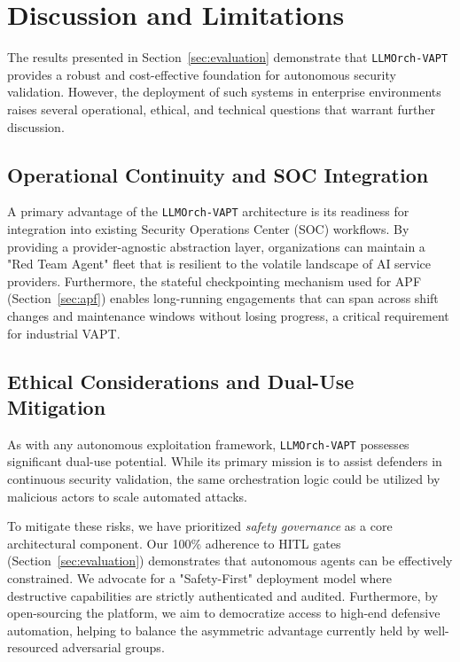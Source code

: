 \section{Discussion and Limitations}
\label{sec:discussion}

The results presented in Section~\ref{sec:evaluation} demonstrate that \texttt{LLMOrch-VAPT} provides a robust and cost-effective foundation for autonomous security validation. However, the deployment of such systems in enterprise environments raises several operational, ethical, and technical questions that warrant further discussion.

\subsection{Operational Continuity and SOC Integration}
A primary advantage of the \texttt{LLMOrch-VAPT} architecture is its readiness for integration into existing Security Operations Center (SOC) workflows. By providing a provider-agnostic abstraction layer, organizations can maintain a "Red Team Agent" fleet that is resilient to the volatile landscape of AI service providers. Furthermore, the stateful checkpointing mechanism used for APF (Section~\ref{sec:apf}) enables long-running engagements that can span across shift changes and maintenance windows without losing progress, a critical requirement for industrial VAPT.

\subsection{Ethical Considerations and Dual-Use Mitigation}
As with any autonomous exploitation framework, \texttt{LLMOrch-VAPT} possesses significant dual-use potential. While its primary mission is to assist defenders in continuous security validation, the same orchestration logic could be utilized by malicious actors to scale automated attacks. 

To mitigate these risks, we have prioritized \textit{safety governance} as a core architectural component. Our 100\% adherence to HITL gates (Section~\ref{sec:evaluation}) demonstrates that autonomous agents can be effectively constrained. We advocate for a "Safety-First" deployment model where destructive capabilities are strictly authenticated and audited. Furthermore, by open-sourcing the platform, we aim to democratize access to high-end defensive automation, helping to balance the asymmetric advantage currently held by well-resourced adversarial groups.

